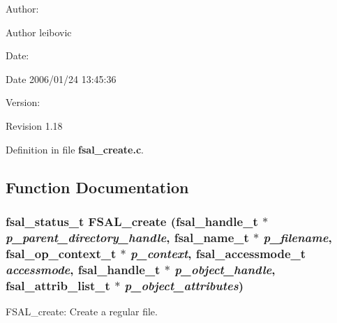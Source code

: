 \begin{Desc}
\item[Author:]\begin{Desc}
\item[Author]leibovic \end{Desc}
\end{Desc}
\begin{Desc}
\item[Date:]\begin{Desc}
\item[Date]2006/01/24 13:45:36 \end{Desc}
\end{Desc}
\begin{Desc}
\item[Version:]\begin{Desc}
\item[Revision]1.18 \end{Desc}
\end{Desc}


Definition in file {\bf fsal\_\-create.c}.

\subsection{Function Documentation}
\subsubsection{\setlength{\rightskip}{0pt plus 5cm}fsal\_\-status\_\-t FSAL\_\-create (fsal\_\-handle\_\-t $\ast$ {\em p\_\-parent\_\-directory\_\-handle}, fsal\_\-name\_\-t $\ast$ {\em p\_\-filename}, fsal\_\-op\_\-context\_\-t $\ast$ {\em p\_\-context}, fsal\_\-accessmode\_\-t {\em accessmode}, fsal\_\-handle\_\-t $\ast$ {\em p\_\-object\_\-handle}, fsal\_\-attrib\_\-list\_\-t $\ast$ {\em p\_\-object\_\-attributes})}\label{fsal__create_8c_a0}


FSAL\_\-create: Create a regular file.

